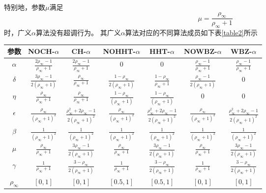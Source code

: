 特别地，参数$\mu$满足
\begin{equation}
\mu=\frac{\rho_{\infty}}{\rho_{\infty}+1}
\end{equation}
时，广义$\alpha$算法没有超调行为。
{}
其广义$\alpha$算法对应的不同算法成员如下表\ref{table2}所示
\vspace{-1cm}
\begin{table}[htbp]
\vspace{0.5em}\centering\wuhao
\begin{tabular}{ccccccc}
\toprule[1.5pt]
参数 & NOCH-$\alpha$ & CH-$\alpha$ & NOHHT-$\alpha$ & HHT-$\alpha$ & NOWBZ-$\alpha$ & WBZ-$\alpha$\\
\midrule[1pt]
$\alpha$ & $\frac{2\rho_{\infty}-1}{\rho_{\infty}+1}$ & $\frac{2\rho_{\infty}-1}{\rho_{\infty}+1}$ & $0$ & $0$ & $\frac{\rho_{\infty}-1}{\rho_{\infty}+1}$ & $\frac{\rho_{\infty}-1}{\rho_{\infty}+1}$\\ [0.5em]
$\delta$ & $\frac{3\rho_{\infty}-1}{2(\rho_{\infty}+1)}$ & $\frac{\rho_{\infty}}{\rho_{\infty}+1}$ & $\frac{1-\rho_{\infty}}{2(\rho_{\infty}+1)}$ & $\frac{1-\rho_{\infty}}{\rho_{\infty}+1}$ & $\frac{\rho_{\infty}-1}{2(\rho_{\infty}+1)}$ & $0$\\ [0.5em]
$\eta$ & $\frac{\rho_{\infty}}{\rho_{\infty}+1}$ & $\frac{\rho_{\infty}}{\rho_{\infty}+1}$ & $\frac{1-\rho_{\infty}}{(\rho_{\infty}+1)}$ & $\frac{1-\rho_{\infty}}{(\rho_{\infty}+1)}$ & $0$ & $0$\\ [0.5em]
$\epsilon$ & $\frac{\rho_{\infty}}{(\rho_{\infty}+1)^2}$ & $\frac{\rho_{\infty}^2+2\rho_{\infty}-1}{2(\rho_{\infty}+1)^2}$ & $\frac{\rho_{\infty}}{(\rho_{\infty}+1)^2}$ & $\frac{\rho_{\infty}^2+2\rho_{\infty}-1}{2(\rho_{\infty}+1)^2}$ & $\frac{\rho_{\infty}}{(\rho_{\infty}+1)^2}$ & $\frac{\rho_{\infty}^2+2\rho_{\infty}-1}{2(\rho_{\infty}+1)^2}$\\ [0.5em]
$\beta$ & $\frac{1}{(\rho_{\infty}+1)^2}$ & $\frac{1}{(\rho_{\infty}+1)^2}$ & $\frac{1}{(\rho_{\infty}+1)^2}$ & $\frac{1}{(\rho_{\infty}+1)^2}$ & $\frac{1}{(\rho_{\infty}+1)^2}$ & $\frac{1}{(\rho_{\infty}+1)^2}$\\ [0.5em]
$\mu$ & $\frac{\rho_{\infty}}{\rho_{\infty}+1}$ & $\frac{3\rho_{\infty}-1}{2(\rho_{\infty}+1)}$ & $\frac{\rho_{\infty}}{\rho_{\infty}+1}$ & $\frac{3\rho_{\infty}-1}{2(\rho_{\infty}+1)}$ & $\frac{\rho_{\infty}}{\rho_{\infty}+1}$ & $\frac{3\rho_{\infty}-1}{2(\rho_{\infty}+1)}$\\ [0.5em]
$\gamma$ & $\frac{1}{\rho_{\infty}+1}$ & $\frac{3-\rho_{\infty}}{2(\rho_{\infty}+1)}$ & $\frac{1}{\rho_{\infty}+1}$ & $\frac{3-\rho_{\infty}}{2(\rho_{\infty}+1)}$ & $\frac{1}{\rho_{\infty}+1}$ & $\frac{3-\rho_{\infty}}{2(\rho_{\infty}+1)}$\\ [0.5em]
$\rho_{\infty}$ & $[0,1]$ & $[0,1]$ & $[0.5,1]$ & $[0.5,1]$ & $[0,1]$ & $[0,1]$\\
\bottomrule[1.5pt]
\end{tabular}
\end{table}

